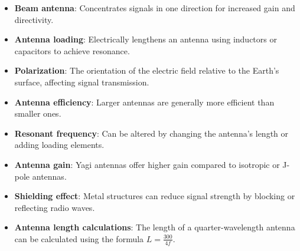 \begin{itemize}
    \item \textbf{Beam antenna}: Concentrates signals in one direction for increased gain and directivity.
    \item \textbf{Antenna loading}: Electrically lengthens an antenna using inductors or capacitors to achieve resonance.
    \item \textbf{Polarization}: The orientation of the electric field relative to the Earth's surface, affecting signal transmission.
    \item \textbf{Antenna efficiency}: Larger antennas are generally more efficient than smaller ones.
    \item \textbf{Resonant frequency}: Can be altered by changing the antenna's length or adding loading elements.
    \item \textbf{Antenna gain}: Yagi antennas offer higher gain compared to isotropic or J-pole antennas.
    \item \textbf{Shielding effect}: Metal structures can reduce signal strength by blocking or reflecting radio waves.
    \item \textbf{Antenna length calculations}: The length of a quarter-wavelength antenna can be calculated using the formula \( L = \frac{300}{4f} \).
\end{itemize}
